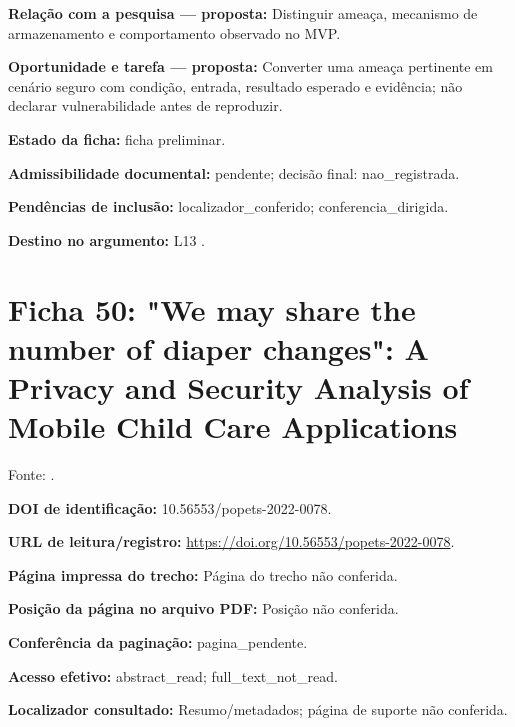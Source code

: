 \noindent\textbf{Relação com a pesquisa — proposta:} Distinguir ameaça, mecanismo de armazenamento e comportamento observado no MVP.\par\medskip

\noindent\textbf{Oportunidade e tarefa — proposta:} Converter uma ameaça pertinente em cenário seguro com condição, entrada, resultado esperado e evidência; não declarar vulnerabilidade antes de reproduzir.\par\medskip

\noindent\textbf{Estado da ficha:} ficha preliminar.\par\medskip

\noindent\textbf{Admissibilidade documental:} pendente; decisão final: nao\_registrada.\par\medskip

\noindent\textbf{Pendências de inclusão:} localizador\_conferido; conferencia\_dirigida.\par\medskip

\noindent\textbf{Destino no argumento:} L13 .

\clearpage\section*{Ficha 50: "We may share the number of diaper changes": A Privacy and Security Analysis of Mobile Child Care Applications}

Fonte: \citet{OS14}.

\noindent\textbf{DOI de identificação:} 10.56553/popets-2022-0078.\par\medskip

\noindent\textbf{URL de leitura/registro:} \url{https://doi.org/10.56553/popets-2022-0078}.\par\medskip

\noindent\textbf{Página impressa do trecho:} Página do trecho não conferida.\par\medskip

\noindent\textbf{Posição da página no arquivo PDF:} Posição não conferida.\par\medskip

\noindent\textbf{Conferência da paginação:} pagina\_pendente.\par\medskip

\noindent\textbf{Acesso efetivo:} abstract\_read; full\_text\_not\_read.\par\medskip

\noindent\textbf{Localizador consultado:} Resumo/metadados; página de suporte não conferida.\par\medskip


